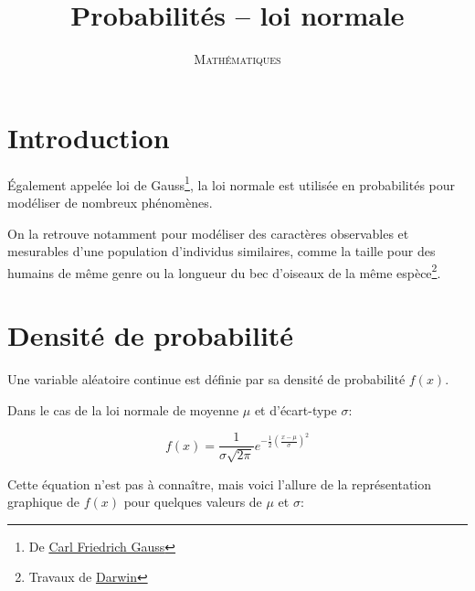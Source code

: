 \documentclass[a4paper,12pt]{scrartcl}
\date{}
\title{Probabilités -- loi normale}
\author{\textsc{Mathématiques}}
\begin{document}
\maketitle

\tableofcontents

\section*{Introduction}

Également appelée loi de Gauss\footnote{De \href{https://fr.wikipedia.org/wiki/Carl_Friedrich_Gauss}{Carl Friedrich Gauss}}, la loi normale est utilisée en probabilités pour modéliser de nombreux phénomènes.

On la retrouve notamment pour modéliser des caractères observables et mesurables d'une population d'individus similaires, comme la taille pour des humains de même genre ou la longueur du bec d'oiseaux de la même espèce\footnote{Travaux de \href{https://fr.wikipedia.org/wiki/Pinsons_de_Darwin}{Darwin}}.

\section{Densité de probabilité}

Une variable aléatoire continue est définie par sa densité de probabilité $f(x)$.

Dans le cas de la loi normale de moyenne $\mu$ et d'écart-type $\sigma$:

\begin{equation}
    f(x) = \dfrac{1}{\sigma \sqrt{2 \pi}} e^{-\frac{1}{2} \left(\frac{x-\mu}{\sigma}\right)^2}
    \label{eq:gaussienne}
\end{equation}

Cette équation n'est pas à connaître, mais voici l'allure de la représentation graphique de $f(x)$ pour quelques valeurs de $\mu$ et $\sigma$:
\end{document}
